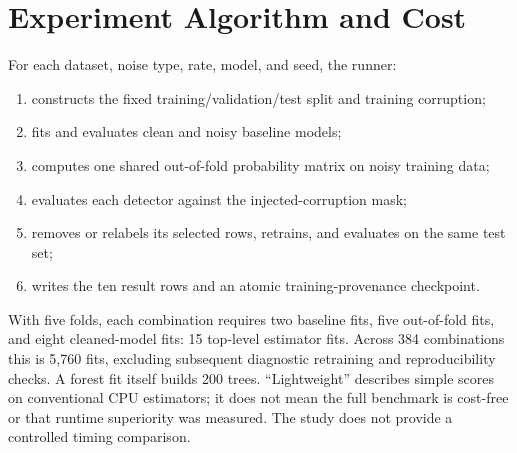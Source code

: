 \section{Experiment Algorithm and Cost}
For each dataset, noise type, rate, model, and seed, the runner:
\begin{enumerate}
\item constructs the fixed training/validation/test split and training corruption;
\item fits and evaluates clean and noisy baseline models;
\item computes one shared out-of-fold probability matrix on noisy training data;
\item evaluates each detector against the injected-corruption mask;
\item removes or relabels its selected rows, retrains, and evaluates on the same test set;
\item writes the ten result rows and an atomic training-provenance checkpoint.
\end{enumerate}
With five folds, each combination requires two baseline fits, five
out-of-fold fits, and eight cleaned-model fits: 15 top-level estimator fits.
Across 384 combinations this is 5,760 fits, excluding subsequent diagnostic
retraining and reproducibility checks. A forest fit itself builds 200 trees.
``Lightweight'' describes simple scores on conventional CPU estimators; it
does not mean the full benchmark is cost-free or that runtime superiority was
measured. The study does not provide a controlled timing comparison.
